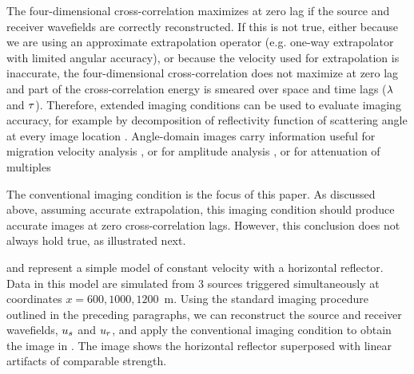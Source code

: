 

The four-dimensional cross-correlation  maximizes at zero lag
if the source and receiver wavefields are correctly reconstructed. If
this is not true, either because we are using an approximate
extrapolation operator (e.g. one-way extrapolator with limited angular
accuracy), or because the velocity used for extrapolation is
inaccurate, the four-dimensional cross-correlation does not maximize
at zero lag and part of the cross-correlation energy is smeared over
space and time lags ($\hh$ and $\tt$). Therefore, extended imaging
conditions can be used to evaluate imaging accuracy, for example by
decomposition of reflectivity function of scattering angle at every
image location
\cite[]{SavaFomel.geo.ang,BiondiSymes.adcig,SavaFomel.geo.tsic}.
Angle-domain images carry information useful for migration velocity
analysis
\cite[]{BiondiSava.segab.1999,SavaBiondi.gp.wemva1,SavaBiondi.gp.wemva2,Shen:2005},
or for amplitude analysis
\cite[]{Sava.segab.2001}, or for attenuation of multiples
\cite[]{SavaGuitton.geo.mat,Artman.multiples}

The conventional imaging condition  is the focus of this
paper. As discussed above, assuming accurate extrapolation, this
imaging condition should produce accurate images at zero
cross-correlation lags. However, this conclusion does not always hold
true, as illustrated next.

 and  represent a simple model of 
constant velocity with a horizontal reflector. Data in this model are
simulated from $3$ sources triggered simultaneously at coordinates
$x=600,1000,1200$~m. Using the standard imaging procedure outlined in
the preceding paragraphs, we can reconstruct the source and receiver
wavefields, $\US$ and $\UR$, and apply the conventional imaging
condition  to obtain the image in . The image
shows the horizontal reflector superposed with linear artifacts of
comparable strength.

